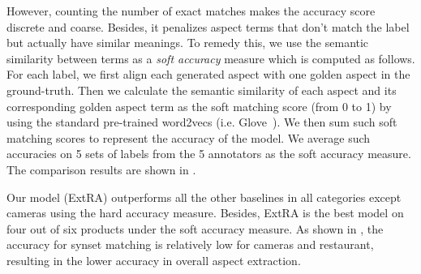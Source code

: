 However, counting the number of exact matches 
makes the accuracy score discrete and coarse. 
Besides, it penalizes aspect terms that don't match the label
but actually have similar meanings.
To remedy this, we use the semantic similarity between
terms as a \emph{soft accuracy}  measure which is
computed as follows.
For each label, we first align each generated aspect with 
one golden aspect in the ground-truth.
Then we calculate the semantic similarity
of each aspect and its corresponding golden aspect term as 
the soft matching score (from 0 to 1) by using the standard 
pre-trained word2vecs (i.e. Glove~).
We then sum such soft matching scores to represent the accuracy of 
the model. We average such accuracies on 5 sets of labels from the 5
annotators as the soft accuracy measure. The comparison results are shown 
in . 

Our model (ExtRA) outperforms all the other baselines 
in all categories except cameras using the hard accuracy measure.
Besides, ExtRA is the best model on four out of six products under the 
soft accuracy measure. As shown in , the accuracy for
synset matching is relatively low for cameras and restaurant,
resulting in the lower accuracy in overall aspect extraction.

